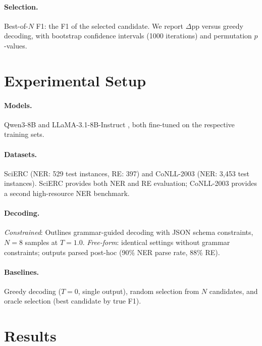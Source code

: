 \documentclass[11pt,a4paper]{article}
\begin{document}
\paragraph{Selection.} Best-of-$N$ F1: the F1 of the selected candidate. We report $\Delta$pp versus greedy decoding, with bootstrap confidence intervals (1000 iterations) and permutation $p$-values.

\section{Experimental Setup}
\label{sec:setup}

\paragraph{Models.} Qwen3-8B \citep{qwen2024} and LLaMA-3.1-8B-Instruct \citep{llama31}, both fine-tuned on the respective training sets.

\paragraph{Datasets.} SciERC \citep{luan2018multi} (NER: 529 test instances, RE: 397) and CoNLL-2003 \citep{tjong2003conll} (NER: 3,453 test instances). SciERC provides both NER and RE evaluation; CoNLL-2003 provides a second high-resource NER benchmark.

\paragraph{Decoding.}
\emph{Constrained}: Outlines grammar-guided decoding \citep{willard2023efficient} with JSON schema constraints, $N = 8$ samples at $T = 1.0$.
\emph{Free-form}: identical settings without grammar constraints; outputs parsed post-hoc (90\% NER parse rate, 88\% RE).

\paragraph{Baselines.} Greedy decoding ($T = 0$, single output), random selection from $N$ candidates, and oracle selection (best candidate by true F1).

\section{Results}
\label{sec:results}
\end{document}
